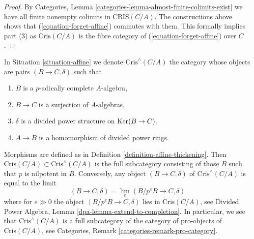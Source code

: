 \begin{proof}
\medskip\noindent
By Categories, Lemma \ref{categories-lemma-almost-finite-colimits-exist}
we have all finite nonempty colimits in $\text{CRIS}(C/A)$. The constructions
above shows that (\ref{equation-forget-affine}) commutes with them.
This formally implies part (3) as $\text{Cris}(C/A)$ is the fibre category
of (\ref{equation-forget-affine}) over $C$.
\end{proof}

\begin{remark}
\label{remark-completed-affine-site}
In Situation \ref{situation-affine} we denote
$\text{Cris}^\wedge(C/A)$ the category whose objects are
pairs $(B \to C, \delta)$ such that
\begin{enumerate}
\item $B$ is a $p$-adically complete $A$-algebra,
\item $B \to C$ is a surjection of $A$-algebras,
\item $\delta$ is a divided power structure on $\mathop{\mathrm{Ker}}(B \to C)$,
\item $A \to B$ is a homomorphism of divided power rings.
\end{enumerate}
Morphisms are defined as in Definition \ref{definition-affine-thickening}.
Then $\text{Cris}(C/A) \subset \text{Cris}^\wedge(C/A)$ is the full
subcategory consisting of those $B$ such that $p$ is nilpotent in $B$.
Conversely, any object $(B \to C, \delta)$ of $\text{Cris}^\wedge(C/A)$
is equal to the limit
$$
(B \to C, \delta) = \lim_e (B/p^eB \to C, \delta)
$$
where for $e \gg 0$ the object $(B/p^eB \to C, \delta)$ lies
in $\text{Cris}(C/A)$, see
Divided Power Algebra, Lemma \ref{dpa-lemma-extend-to-completion}.
In particular, we see that $\text{Cris}^\wedge(C/A)$ is a full subcategory
of the category of pro-objects of $\text{Cris}(C/A)$, see
Categories, Remark \ref{categories-remark-pro-category}.
\end{remark}

